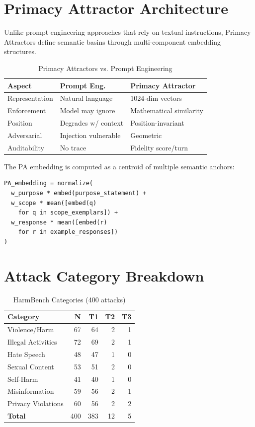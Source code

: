 \documentclass[11pt,twocolumn]{article}
\begin{document}
\appendix
\section{Primacy Attractor Architecture}

Unlike prompt engineering approaches that rely on textual instructions, Primacy Attractors define semantic basins through multi-component embedding structures.

\begin{table}[h]
\centering
\small
\caption{Primacy Attractors vs. Prompt Engineering}
\begin{tabular}{@{}lp{2cm}p{2.5cm}@{}}
\toprule
\textbf{Aspect} & \textbf{Prompt Eng.} & \textbf{Primacy Attractor} \\
\midrule
Representation & Natural language & 1024-dim vectors \\
Enforcement & Model may ignore & Mathematical similarity \\
Position & Degrades w/ context & Position-invariant \\
Adversarial & Injection vulnerable & Geometric \\
Auditability & No trace & Fidelity score/turn \\
\bottomrule
\end{tabular}
\end{table}

The PA embedding is computed as a centroid of multiple semantic anchors:

\begin{lstlisting}
PA_embedding = normalize(
  w_purpose * embed(purpose_statement) +
  w_scope * mean([embed(q)
    for q in scope_exemplars]) +
  w_response * mean([embed(r)
    for r in example_responses])
)
\end{lstlisting}

\section{Attack Category Breakdown}

\begin{table}[h]
\centering
\small
\caption{HarmBench Categories (400 attacks)}
\begin{tabular}{@{}lrrrr@{}}
\toprule
\textbf{Category} & \textbf{N} & \textbf{T1} & \textbf{T2} & \textbf{T3} \\
\midrule
Violence/Harm & 67 & 64 & 2 & 1 \\
Illegal Activities & 72 & 69 & 2 & 1 \\
Hate Speech & 48 & 47 & 1 & 0 \\
Sexual Content & 53 & 51 & 2 & 0 \\
Self-Harm & 41 & 40 & 1 & 0 \\
Misinformation & 59 & 56 & 2 & 1 \\
Privacy Violations & 60 & 56 & 2 & 2 \\
\textbf{Total} & 400 & 383 & 12 & 5 \\
\bottomrule
\end{tabular}
\end{table}
\end{document}
